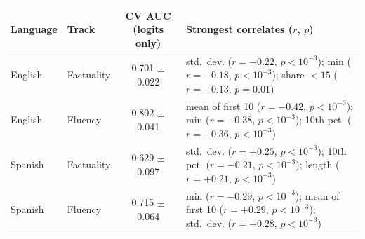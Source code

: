 \begin{tabular}{llcl}
\hline
\textbf{Language} & \textbf{Track} & \textbf{CV AUC (logits only)} & \textbf{Strongest correlates ($r$, $p$)} \\
\hline
English & Factuality & 0.701 $\pm$ 0.022 & std.\ dev. ($r=+0.22$, $p<10^{-3}$); min ($r=-0.18$, $p<10^{-3}$); share $<15$ ($r=-0.13$, $p=0.01$) \\
English & Fluency & 0.802 $\pm$ 0.041 & mean of first 10 ($r=-0.42$, $p<10^{-3}$); min ($r=-0.38$, $p<10^{-3}$); 10th pct. ($r=-0.36$, $p<10^{-3}$) \\
Spanish & Factuality & 0.629 $\pm$ 0.097 & std.\ dev. ($r=+0.25$, $p<10^{-3}$); 10th pct. ($r=-0.21$, $p<10^{-3}$); length ($r=+0.21$, $p<10^{-3}$) \\
Spanish & Fluency & 0.715 $\pm$ 0.064 & min ($r=-0.29$, $p<10^{-3}$); mean of first 10 ($r=+0.29$, $p<10^{-3}$); std.\ dev. ($r=+0.28$, $p<10^{-3}$) \\
\hline
\end{tabular}
